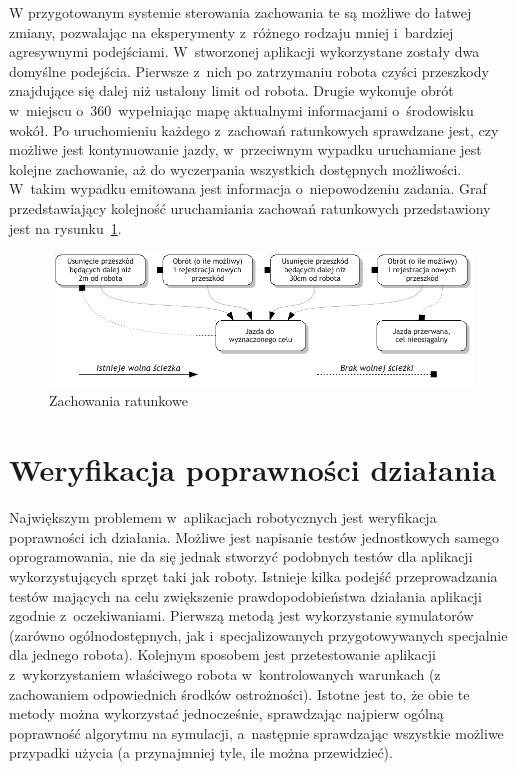 W przygotowanym systemie sterowania zachowania te są możliwe do łatwej zmiany, pozwalając
na eksperymenty z~różnego rodzaju mniej i~bardziej agresywnymi podejściami. W~stworzonej
aplikacji wykorzystane zostały dwa domyślne podejścia. Pierwsze z~nich po zatrzymaniu
robota czyści przeszkody znajdujące się dalej niż ustalony limit od robota. Drugie
wykonuje obrót w~miejscu o~360\textdegree~wypełniając mapę aktualnymi informacjami
o~środowisku wokół. Po uruchomieniu każdego z~zachowań ratunkowych sprawdzane jest,
czy możliwe jest kontynuowanie jazdy, w~przeciwnym wypadku uruchamiane jest kolejne
zachowanie, aż do wyczerpania wszystkich dostępnych możliwości. W~takim wypadku
emitowana jest informacja o~niepowodzeniu zadania. Graf przedstawiający kolejność
uruchamiania zachowań ratunkowych przedstawiony jest na rysunku~\ref{fig:recovery}.

\begin{figure}[h!]
\centering
\includegraphics[width=\textwidth]{../img/recovery}
\caption{Zachowania ratunkowe}
\label{fig:recovery}
\end{figure}

\section{Weryfikacja poprawności działania}

Największym problemem w~aplikacjach robotycznych jest weryfikacja poprawności ich
działania. Możliwe jest napisanie testów jednostkowych samego oprogramowania,
nie da się jednak stworzyć podobnych testów dla aplikacji wykorzystujących sprzęt
taki jak roboty. Istnieje kilka podejść przeprowadzania testów mających na celu
zwiększenie prawdopodobieństwa działania aplikacji zgodnie z~oczekiwaniami.
Pierwszą metodą jest wykorzystanie symulatorów (zarówno ogólnodostępnych, jak
i~specjalizowanych przygotowywanych specjalnie dla jednego robota). Kolejnym sposobem
jest przetestowanie aplikacji z~wykorzystaniem właściwego robota w~kontrolowanych
warunkach (z zachowaniem odpowiednich środków ostrożności). Istotne jest to, że
obie te metody można wykorzystać jednocześnie, sprawdzając najpierw ogólną poprawność
algorytmu na symulacji, a~następnie sprawdzając wszystkie możliwe przypadki użycia
(a przynajmniej tyle, ile można przewidzieć).

